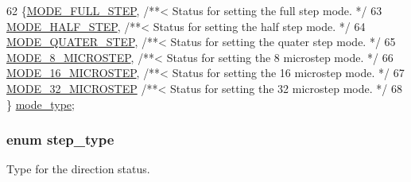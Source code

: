 \begin{DoxyCode}
62              \{\hyperlink{group__biba__drv_gga19269c193c0c4866cdc4e5abd433f9fcaed3032a935a3b2a2ab90e2500dee1177}{MODE\_FULL\_STEP},   \textcolor{comment}{/**< Status for setting the full step mode. */}
63         \hyperlink{group__biba__drv_gga19269c193c0c4866cdc4e5abd433f9fca7bf7cb276c55a5c4e13149d1e18b320f}{MODE\_HALF\_STEP},         \textcolor{comment}{/**< Status for setting the half step mode. */}
64         \hyperlink{group__biba__drv_gga19269c193c0c4866cdc4e5abd433f9fcaf16653dd137a6079ff5399de04861835}{MODE\_QUATER\_STEP},       \textcolor{comment}{/**< Status for setting the quater step mode. */}
65         \hyperlink{group__biba__drv_gga19269c193c0c4866cdc4e5abd433f9fca4db57f4a88897e48818d92a223cd72d7}{MODE\_8\_MICROSTEP},       \textcolor{comment}{/**< Status for setting the 8 microstep mode. */}
66         \hyperlink{group__biba__drv_gga19269c193c0c4866cdc4e5abd433f9fcac75bcca2721976d5185711ca481ccbb0}{MODE\_16\_MICROSTEP},      \textcolor{comment}{/**< Status for setting the 16 microstep mode. */}
67         \hyperlink{group__biba__drv_gga19269c193c0c4866cdc4e5abd433f9fcacb3d9ffb67d18343290fe5474bc1b4d5}{MODE\_32\_MICROSTEP}       \textcolor{comment}{/**< Status for setting the 32 microstep mode. */}
68         \} \hyperlink{group__biba__drv_ga19269c193c0c4866cdc4e5abd433f9fc}{mode\_type};
\end{DoxyCode}
\hypertarget{group__biba__drv_ga3af682b92aa259509aea217f6dc64356}{
\subsubsection[{step\-\_\-type}]{\setlength{\rightskip}{0pt plus 5cm}enum {\bf step\-\_\-type}}}\label{group__biba__drv_ga3af682b92aa259509aea217f6dc64356}


Type for the direction status. 

